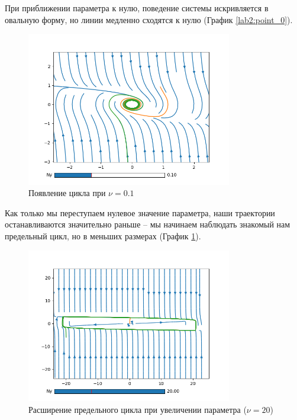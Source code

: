При приближении параметра к нулю, поведение системы искривляется в овальную
форму, но линии медленно сходятся к нулю (График \ref{lab2:point_0}).

\begin{figure}[!ht]
    \centering
    \includegraphics[width=0.8\textwidth]{figures/2_cycle_0_1}
    \caption{Появление цикла при $\nu = 0.1$}
    \label{lab2:cycle_0_1}
\end{figure}

Как только мы переступаем нулевое значение параметра, наши траектории
останавливаются значительно раньше -- мы начинаем наблюдать знакомый нам
предельный цикл, но в меньших размерах (График \ref{lab2:cycle_0_1}).

\begin{figure}[!ht]
    \centering
    \includegraphics[width=0.8\textwidth]{figures/2_cycle_20}
    \caption{Расширение предельного цикла при увеличении параметра ($\nu = 20$)}
    \label{lab2:cycle_20}
\end{figure}

